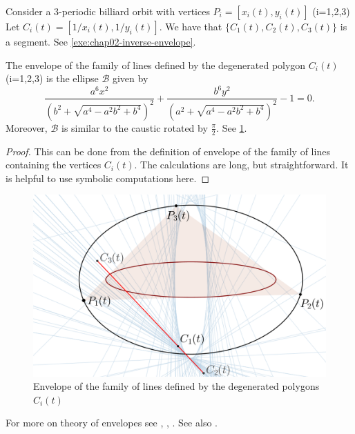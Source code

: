  
 
 Consider a  3-periodic  billiard orbit with vertices $P_i=[x_i(t),y_i(t)]$ (i=1,2,3)
Let $C_i(t)=[1/x_i(t),1/y_i(t)]$. We have that $\{C_1(t),C_2(t),C_3(t)\}$ is a segment. See \cref{exe:chap02-inverse-envelope}.
\begin{proposition}
    The envelope of the family of lines defined by the degenerated polygon $C_i(t)$ (i=1,2,3) is the ellipse $\mathcal{B}$ given by
    \[ {\frac {{a}^{6}{x}^{2}}{ \left( {b}^{2}+\sqrt {{a}^{4}-{a}^{2}{b}^{2}+
{b}^{4}} \right) ^{2}}}+{\frac {{b}^{6}{y}^{2}}{ \left( {a}^{2}+\sqrt 
{{a}^{4}-{a}^{2}{b}^{2}+{b}^{4}} \right) ^{2}}}-1
=0.
    \]
    Moreover, $\mathcal{B}$ is similar to the caustic rotated by $\frac{\pi}{2}.$ See   \cref{fig:appB-inverso-envelope}.
\end{proposition}
 
\begin{proof}
This can be done from the definition of envelope of the family of lines containing the vertices $C_i(t)$.
The calculations are long, but straightforward.
It is helpful to use symbolic computations here. 
\end{proof}

 \begin{figure}
     \centering
     \includegraphics[scale=0.5]{zappB/pics/pics-appB-040inverso_locus_envelope.png}
     \caption{Envelope of the family of lines defined by the degenerated polygons $C_i(t)$}
     \label{fig:appB-inverso-envelope}
 \end{figure}
 
  For more on theory of envelopes see  \cite[Chapter  3]{arnold-1994},  \cite[pp. 305]{berger-1992}, \cite[Chapter   5]{bruce-1992}.  See also \cite[Cap. 1]{carneiro2019-impa}.
 

 

